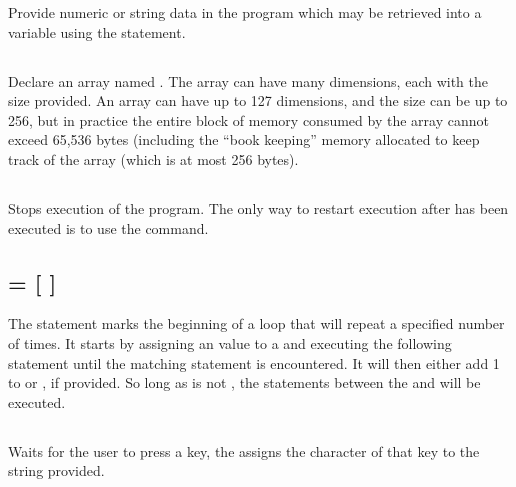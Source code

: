 \documentclass{report}
\begin{document}
    Provide numeric or string data in the program which may be retrieved into a variable using the  statement.

    \subsection*{}

    Declare an array named .
    The array can have many dimensions, each with the size provided.
    An array can have up to 127 dimensions, and the size can be up to 256, but in practice the entire block of memory
    consumed by the array cannot exceed 65,536 bytes (including the ``book keeping'' memory allocated to keep track of the array
    (which is at most 256 bytes).

    \subsection*{}

    Stops execution of the program. The only way to restart execution after  has been
    executed is to use the  command.

    \subsection*{  =    [ ]}

    The  statement marks the beginning of a loop that will repeat a specified number of times.
    It starts by assigning an  value to a  and executing the following statement until
    the matching  statement is encountered. It will then either add 1 to  or
    , if provided. So long as  is not , the statements between the
     and  will be executed.

    \subsection*{ }

    Waits for the user to press a key, the assigns the character of that key to the string  provided.

    \subsection*{ }
\end{document}
